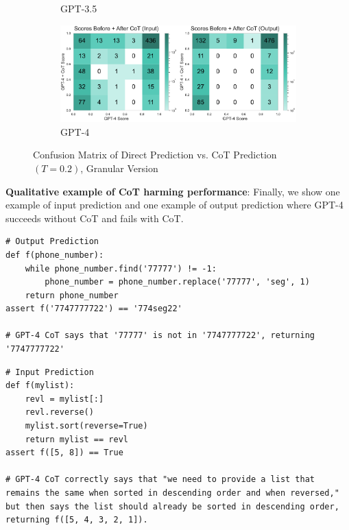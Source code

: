 \begin{figure}[H]
\begin{subfigure}[t]{0.49\textwidth}
         \caption{GPT-3.5}
     \end{subfigure}%
     \hfill
     \begin{subfigure}[t]{0.49\textwidth}
         \centering
         \includegraphics[width=\textwidth]{figs/confusion_cot/cot_confusion_granular_gpt4.pdf}
         \caption{GPT-4}
     \end{subfigure}
     \caption{Confusion Matrix of Direct Prediction vs. CoT Prediction $(T=0.2)$, Granular Version}
     \label{fig:confusion-cot-all-granular}
\end{figure}

\textbf{Qualitative example of CoT harming performance}: Finally, we show one example of input prediction and one example of output prediction where GPT-4 succeeds without CoT and fails with CoT.
\begin{lstlisting}
# Output Prediction
def f(phone_number):
    while phone_number.find('77777') != -1:
        phone_number = phone_number.replace('77777', 'seg', 1)
    return phone_number
assert f('7747777722') == '774seg22'

# GPT-4 CoT says that '77777' is not in '7747777722', returning '7747777722'
\end{lstlisting}

\begin{lstlisting}
# Input Prediction
def f(mylist):
    revl = mylist[:]
    revl.reverse()
    mylist.sort(reverse=True)
    return mylist == revl
assert f([5, 8]) == True

# GPT-4 CoT correctly says that "we need to provide a list that remains the same when sorted in descending order and when reversed," but then says the list should already be sorted in descending order, returning f([5, 4, 3, 2, 1]).
\end{lstlisting}

